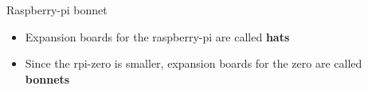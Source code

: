 \begin{frame}
   {Raspberry-pi bonnet}
   \begin{itemize}
      \item Expansion boards for the raspberry-pi are called \textbf{hats}
      \item Since the rpi-zero is smaller, expansion boards for the zero
	      are called \textbf{bonnets}
   \end{itemize}
\end{frame}

\cprotect{}

